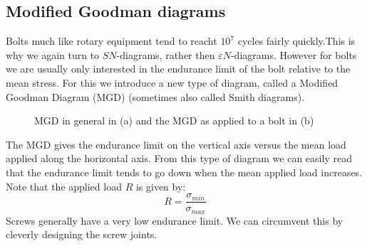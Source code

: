 \documentclass[11pt, a4paper]{article}
\renewcommand*{\epsilon}{\varepsilon}
\begin{document}
\subsection{Modified Goodman diagrams}
Bolts much like rotary equipment tend to reacht $10^7$ cycles fairly quickly.This is why we again turn to $SN$-diagrams, rather then $\epsilon N$-diagrams. However for bolts we are usually only interested in the endurance limit of the bolt relative to the mean stress. For this we introduce a new type of diagram, called a Modified Goodman Diagram (MGD) (sometimes also called Smith diagrams).
\begin{figure}[H]
  \centering
  \qquad
  \caption{MGD in general in (a) and the MGD as applied to a bolt in (b)}
\end{figure}
The MGD gives the endurance limit on the vertical axis versus the mean load applied along the horizontal axis. From this type of diagram we can easily read that the endurance limit tends to go down when the mean applied load increases. Note that the applied load $R$ is given by:
\begin{equation}
  R = \frac{\sigma_{min}}{\sigma_{max}}
\end{equation}
Screws generally have a very low endurance limit. We can circumvent this by cleverly designing the screw joints.
\end{document}
